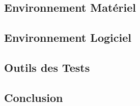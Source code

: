 \subsection{Environnement Matériel}

\subsection{Environnement Logiciel}

\subsection{Outils des Tests}

\subsection*{Conclusion}
